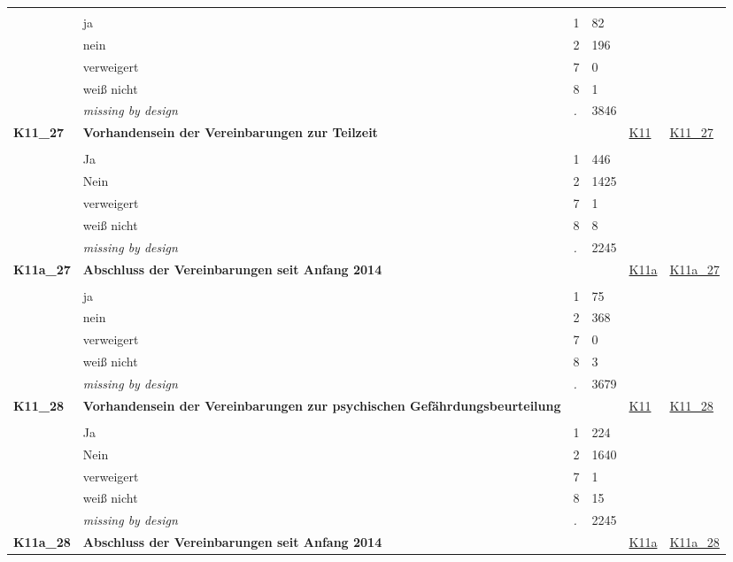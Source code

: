 \begin{longtable}{| L{2.45cm} | L{6cm} | C{1.5cm} | R{1cm} | C{2.25cm} | C{2.25cm} |}
   &  &  &  &  &  \\ 
   & ja & 1 & 82 &  &  \\ 
   & nein & 2 & 196 &  &  \\ 
   & verweigert & 7 & 0 &  &  \\ 
   & weiß nicht & 8 & 1 &  &  \\ 
   & \textit{missing by design} & \textit{.} & 3846 &  &  \\ 
   \midrule
\textbf{K11\_27}\label{var:K11:27} & \textbf{Vorhandensein der Vereinbarungen zur Teilzeit} &  &  & \hyperref[K11]{K11} & \hyperref[var:suf:K11:27]{K11\_27} \\ 
   &  &  &  &  &  \\ 
   & Ja & 1 & 446 &  &  \\ 
   & Nein & 2 & 1425 &  &  \\ 
   & verweigert & 7 & 1 &  &  \\ 
   & weiß nicht & 8 & 8 &  &  \\ 
   & \textit{missing by design} & \textit{.} & 2245 &  &  \\ 
   \midrule
\textbf{K11a\_27}\label{var:K11a:27} & \textbf{Abschluss der Vereinbarungen seit Anfang 2014} &  &  & \hyperref[K11a]{K11a} & \hyperref[var:suf:K11a:27]{K11a\_27} \\ 
   &  &  &  &  &  \\ 
   & ja & 1 & 75 &  &  \\ 
   & nein & 2 & 368 &  &  \\ 
   & verweigert & 7 & 0 &  &  \\ 
   & weiß nicht & 8 & 3 &  &  \\ 
   & \textit{missing by design} & \textit{.} & 3679 &  &  \\ 
   \midrule
\textbf{K11\_28}\label{var:K11:28} & \textbf{Vorhandensein der Vereinbarungen zur psychischen Gefährdungsbeurteilung} &  &  & \hyperref[K11]{K11} & \hyperref[var:suf:K11:28]{K11\_28} \\ 
   &  &  &  &  &  \\ 
   & Ja & 1 & 224 &  &  \\ 
   & Nein & 2 & 1640 &  &  \\ 
   & verweigert & 7 & 1 &  &  \\ 
   & weiß nicht & 8 & 15 &  &  \\ 
   & \textit{missing by design} & \textit{.} & 2245 &  &  \\ 
   \midrule
\textbf{K11a\_28}\label{var:K11a:28} & \textbf{Abschluss der Vereinbarungen seit Anfang 2014} &  &  & \hyperref[K11a]{K11a} & \hyperref[var:suf:K11a:28]{K11a\_28} \\ 

\end{longtable}
